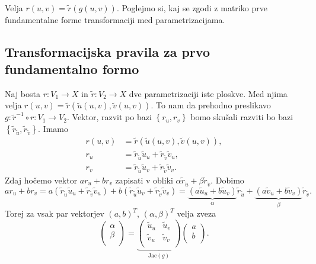 Velja $r(u,v) = \tilde{r}(g(u,v))$. Poglejmo si, kaj se zgodi z matriko prve fundamentalne forme transformaciji med parametrizacijama.


\subsection{Transformacijska pravila za prvo fundamentalno formo}

Naj bosta $r: V_1 \to  X$ in $\tilde{r}: V_2 \to  X$ dve parametrizaciji iste ploskve. Med njima velja $r(u,v) = \tilde{r}(\tilde{u}(u,v), \tilde{v}(u,v))$.
To nam da prehodno preslikavo $g: \tilde{r}^{-1} \circ  r : V_1 \to  V_2$. Vektor, razvit po bazi $\left\{ r_u, r_v \right\}$ bomo skušali
razviti bo bazi $\left\{ \tilde{r}_{\tilde{u}}, \tilde{r}_{\tilde{v}} \right\}$. Imamo 
\begin{align*}
  r(u,v) &= \tilde{r}(\tilde{u}(u,v), \tilde{v}(u,v)), \\
  r_u   &= \tilde{r}_{\tilde{u}} \tilde{u}_u + \tilde{r}_{\tilde{v}} \tilde{v}_u, \\ 
  r_v &= \tilde{r}_{\tilde{u}} \tilde{u}_v + \tilde{r}_{\tilde{v}} \tilde{v}_v.
\end{align*}
Zdaj hočemo vektor $a r_u + b r_v$ zapisati v obliki $\alpha \tilde{r}_\tilde{u} + \beta \tilde{r}_\tilde{v}$. Dobimo 
\begin{equation*} a r_u + b r_v  = a(\tilde{r}_{\tilde{u}} \tilde{u}_u + \tilde{r}_{\tilde{v}} \tilde{v}_u) + b (\tilde{r}_{\tilde{u}} \tilde{u}_v + \tilde{r}_{\tilde{v}} \tilde{v}_v) 
= \underbrace{(a \tilde{u}_u + b \tilde{u}_v)}_{\alpha} \tilde{r}_{\tilde{u}} + \underbrace{(a \tilde{v}_u + b \tilde{v}_v)}_{\beta} \tilde{r}_{\tilde{v}}. \end{equation*}
Torej za vsak par vektorjev $(a, b)^{T}$, $(\alpha, \beta)^{T}$ velja zveza 
\begin{equation*} \begin{pmatrix}
  \alpha\\
  \beta\\
\end{pmatrix} = 
\underbrace{\begin{pmatrix}
  \tilde{u}_u & \tilde{u}_v\\
  \tilde{v}_u & \tilde{v}_v \\
\end{pmatrix}}_{\text{Jac}(g)}  
\begin{pmatrix}
  a\\
  b\\
\end{pmatrix}. \end{equation*}

